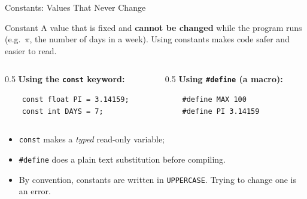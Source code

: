 \documentclass[aspectratio=169]{beamer}
\begin{document}
	\begin{frame}[fragile]{Constants: Values That Never Change}
		\begin{block}{Constant}
			A value that is fixed and \textbf{cannot be changed} while the program runs (e.g.\ $\pi$, the number of days in a week). Using constants makes code safer and easier to read.
		\end{block}
		\begin{columns}[T]
			\begin{column}{0.5\textwidth}
				\textbf{Using the \texttt{const} keyword:}
\begin{lstlisting}
	const float PI = 3.14159;
	const int DAYS = 7;
\end{lstlisting}
			\end{column}
			\begin{column}{0.5\textwidth}
				\textbf{Using \texttt{\#define} (a macro):}
\begin{lstlisting}
	#define MAX 100
	#define PI 3.14159
\end{lstlisting}
			\end{column}
		\end{columns}
		\vspace{0.1cm}
		\begin{itemize}
			\item \texttt{const} makes a \emph{typed} read-only variable; 
			\item \texttt{\#define} does a plain text substitution before compiling.
			\item By convention, constants are written in \texttt{UPPERCASE}. Trying to change one is an error.
		\end{itemize}
	\end{frame}
	
\end{document}
